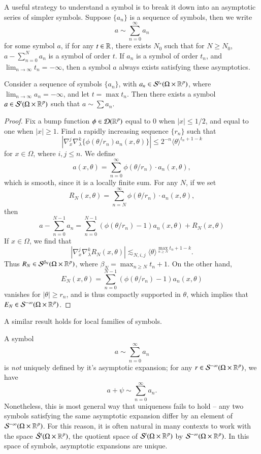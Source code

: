 A useful strategy to understand a symbol is to break it down into an asymptotic series of simpler symbols. Suppose $\{ a_n \}$ is a sequence of symbols, then we write
%
\[ a \sim \sum_{n = 0}^\infty a_n \]
%
for some symbol $a$, if for any $t \in \operatorname{\mathbb{R}}$, there exists $N_0$ such that for $N \geq N_0$, $a - \sum_{n = 0}^N a_n$ is a symbol of order $t$. If $a_n$ is a symbol of order $t_n$, and $\lim_{n \to \infty} t_n = -\infty$, then a symbol $a$ always exists satisfying these asymptotics.

\begin{theorem}
    Consider a sequence of symbols $\{ a_n \}$, with $a_n \in \mathcal{S}^{t_n}(\Omega \times \operatorname{\mathbb{R}}^p)$, where $\lim_{n \to \infty} a_n = -\infty$, and let $t = \max t_n$. Then there exists a symbol $a \in \mathcal{S}^t(\Omega \times \operatorname{\mathbb{R}}^p)$ such that $a \sim \sum a_n$.
\end{theorem}
\begin{proof}
    Fix a bump function $\phi \in \operatorname{\mathcal{D}}(\operatorname{\mathbb{R}}^p)$ equal to 0 when $|x| \leq 1/2$, and equal to one when $|x| \geq 1$. Find a rapidly increasing sequence $\{ r_n \}$ such that
    \[ | \nabla_x^j \nabla_\lambda^k \{ \phi( \theta / r_n ) a_n(x,\theta) \} | \leq 2^{-n} \langle \theta \rangle^{t_n + 1 - k} \]
    for $x \in \Omega$, where $i,j \leq n$. We define
    \[ a(x,\theta) = \sum_{n = 0}^\infty \phi(\theta / r_n) \cdot a_n(x,\theta), \]
    which is smooth, since it is a locally finite sum. For any $N$, if we set
    \[ R_N(x,\theta) = \sum_{n = N}^\infty \phi(\theta / r_n) \cdot a_n(x,\theta), \]
    then
    \[ a - \sum_{n = 0}^{N-1} a_n = \sum_{n = 0}^{N-1} (\phi(\theta/r_n) - 1) a_n(x,\theta) + R_N(x,\theta) \]
    If $x \in \Omega$, we find that
    \[ | \nabla_x^j \nabla_\lambda^k R_N(x,\theta) | \lesssim_{N,i,j} \langle \theta \rangle^{\max_{n \geq N} t_n + 1 - k}. \]
    Thus $R_N \in \mathcal{S}^{\beta_N}(\Omega \times \operatorname{\mathbb{R}}^p)$, where $\beta_N = \max_{n \geq N} t_n + 1$. On the other hand,
    \[ E_N(x,\theta) = \sum_{n = 0}^{N-1} (\phi(\theta/r_n) - 1) a_n(x,\theta) \]
    vanishes for $|\theta| \geq r_n$, and is thus compactly supported in $\theta$, which implies that $E_N \in \mathcal{S}^{-\infty}(\Omega \times \operatorname{\mathbb{R}}^p)$.
\end{proof}

\begin{remark}
    A similar result holds for local families of symbols.
\end{remark}

A symbol
%
\[ a \sim \sum_{n = 0}^\infty a_n \]
%
is \emph{not} uniquely defined by it's asymptotic expansion; for any $r \in \mathcal{S}^{-\infty}(\Omega \times \operatorname{\mathbb{R}}^p)$, we have
%
\[ a + \psi \sim \sum_{n = 0}^\infty a_n. \]
%
Nonetheless, this is most general way that uniqueness fails to hold -- any two symbols satisfying the same asymptotic expansion differ by an element of $\mathcal{S}^{-\infty}(\Omega \times \operatorname{\mathbb{R}}^p)$. For this reason, it is often natural in many contexts to work with the space $\dot{\mathcal{S}}^t(\Omega \times \operatorname{\mathbb{R}}^p)$, the quotient space of $\mathcal{S}^t(\Omega \times \operatorname{\mathbb{R}}^p)$ by $\mathcal{S}^{-\infty}(\Omega \times \operatorname{\mathbb{R}}^p)$. In this space of symbols, asymptotic expansions are unique.

